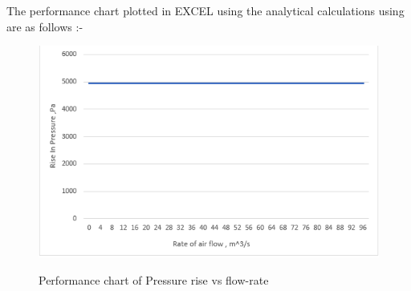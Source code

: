 \documentclass[11pt]{article}
\begin{document}
  The performance chart plotted in EXCEL using the analytical calculations using are as follows :-\\
  
 \begin{figure}[h!]
\centering
\includegraphics[scale=1]{pvsq.png}\\
\caption{Performance chart of Pressure rise vs flow-rate}
\end{figure}
\end{document}
